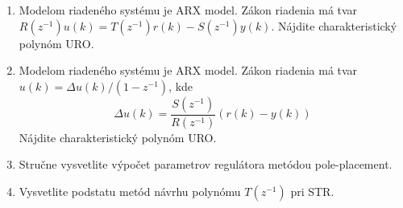 \documentclass[a4paper, 10pt, ]{article}
\begin{document}
\begin{enumerate}

	\item Modelom riadeného systému je ARX model. Zákon riadenia má tvar $R(z^{-1}) u(k) =  T(z^{-1}) r(k) -  S(z^{-1}) y(k)$. Nájdite charakteristický polynóm URO.

	\item Modelom riadeného systému je ARX model. Zákon riadenia má tvar $ u(k) =  \Delta u(k) / (1 - z^{-1})$, kde
	\begin{equation*}
		\Delta u(k) = \frac{S(z^{-1})}{R(z^{-1})} (r(k) - y(k))
	\end{equation*}
		Nájdite charakteristický polynóm URO.

	\item Stručne vysvetlite výpočet parametrov regulátora metódou pole-placement.

	\item Vysvetlite podstatu metód návrhu polynómu $T(z^{-1})$ pri STR.

\end{enumerate}
\end{document}
